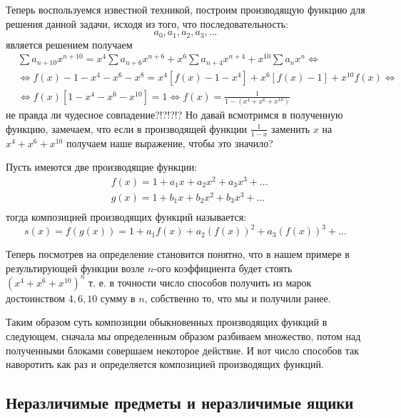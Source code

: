 Теперь воспользуемся известной техникой, построим производящую функцию для решения данной задачи, исходя из того, что последовательность:
\[
	a_0, a_1, a_2, a_3, ...
\]
является решением получаем
\[
	\begin{split}
		& \sum a_{n+10} x^{n+10} = x^4 \sum a_{n+6} x^{n+6} + x^6 \sum a_{n+4} x^{n+4} + x^{10} \sum a_n x^{n} \Leftrightarrow \\
		& \Leftrightarrow f\left(x\right) - 1 - x^4 - x^6 - x^8 = x^4 \left[f\left(x\right) - 1 - x^4\right] + x^6 \left[f\left(x\right) - 1\right] + x^{10} f\left(x\right) \Leftrightarrow \\
		& \Leftrightarrow f\left(x\right) \left[1 - x^4 - x^6 - x^{10}\right] = 1 \Leftrightarrow f\left(x\right) = \frac{1}{1 - \left(x^4 + x^6 + x^{10}\right)}
	\end{split}
\]
не правда ли чудесное совпадение?!?!?!? Но давай всмотримся в полученную функцию, замечаем, что если в производящей функции $\frac{1}{1 - x}$ заменить $x$ на $x^4 + x^6 + x^{10}$ получаем наше выражение, чтобы это значило?

\begin{Def}
Пусть имеются две производящие функции:
\[
	\begin{split}
		& f\left(x\right) = 1 + a_1 x + a_2 x^2 + a_3 x^3 + ... \\
		& g\left(x\right) = 1 + b_1 x + b_2 x^2 + b_3 x^3 + ... \\
	\end{split}
\]
тогда композицией производящих функций называется:
\[
	s\left(x\right) = f\left(g\left(x\right)\right) = 1 + a_1 f\left(x\right) + a_2 \left(f\left(x\right)\right)^2 + a_3 \left(f\left(x\right)\right)^3 + ...
\]
\end{Def}

Теперь посмотрев на определение становится понятно, что в нашем примере в результирующей функции возле $n$-ого коэффициента будет стоять $\left(x^4 + x^6 + x^10\right)^n$ т. е. в точности число способов получить из марок достоинством $4, 6, 10$ сумму в $n$, собственно то, что мы и получили ранее.

Таким образом суть композиции обыкновенных производящих функций в следующем, сначала мы определенным образом разбиваем множество, потом над полученными блоками совершаем некоторое действие. И вот число способов так наворотить как раз и определяется композицией производящих функций.

\subsection{Неразличимые предметы и неразличимые ящики}

